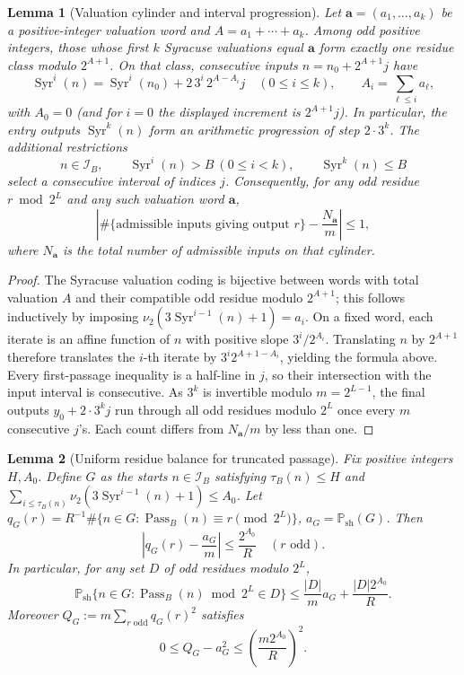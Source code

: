 \documentclass[11pt]{amsart}
\newtheorem{lemma}{Lemma}
\theoremstyle{remark}\newtheorem{remark}{Remark}
\newcommand{\Syr}{\operatorname{Syr}}
\newcommand{\Pass}{\operatorname{Pass}}
\newcommand{\Psh}{\mathbb P_{\mathrm{sh}}}
\begin{document}
\begin{lemma}[Valuation cylinder and interval progression]\label{lem:progression}
Let $\mathbf a=(a_1,\ldots,a_k)$ be a positive-integer valuation word and $A=a_1+\cdots+a_k$.  Among odd positive integers, those whose first $k$ Syracuse valuations equal $\mathbf a$ form exactly one residue class modulo $2^{A+1}$.  On that class, consecutive inputs $n=n_0+2^{A+1}j$ have
\[
 \Syr^i(n)=\Syr^i(n_0)+2\,3^i\,2^{A-A_i}j\quad(0\le i\le k),
 \qquad A_i=\sum_{\ell\le i}a_\ell,
\]
with $A_0=0$ (and for $i=0$ the displayed increment is $2^{A+1}j$).  In particular, the entry outputs $\Syr^k(n)$ form an arithmetic progression of step $2\cdot3^k$.  The additional restrictions
\[
 n\in\mathcal I_B,\qquad \Syr^i(n)>B\ (0\le i<k),\qquad
 \Syr^k(n)\le B
\]
select a \emph{consecutive interval} of indices $j$.  Consequently, for any odd residue $r\bmod2^L$ and any such valuation word $\mathbf a$,
\[
 \left|\#\{\text{admissible inputs giving output }r\}-\frac{N_{\mathbf a}}m\right|\le1,
\]
where $N_{\mathbf a}$ is the total number of admissible inputs on that cylinder.
\end{lemma}
\begin{proof}
The Syracuse valuation coding is bijective between words with total valuation $A$ and their compatible odd residue modulo $2^{A+1}$; this follows inductively by imposing $\nu_2(3\Syr^{i-1}(n)+1)=a_i$. On a fixed word, each iterate is an affine function of $n$ with positive slope $3^i/2^{A_i}$.  Translating $n$ by $2^{A+1}$ therefore translates the $i$-th iterate by $3^i2^{A+1-A_i}$, yielding the formula above.  Every first-passage inequality is a half-line in $j$, so their intersection with the input interval is consecutive.  As $3^k$ is invertible modulo $m=2^{L-1}$, the final outputs $y_0+2\cdot3^kj$ run through all odd residues modulo $2^L$ once every $m$ consecutive $j$'s.  Each count differs from $N_{\mathbf a}/m$ by less than one.
\end{proof}
\begin{lemma}[Uniform residue balance for truncated passage]\label{lem:balance}
Fix positive integers $H,A_0$.  Define $G$ as the starts $n\in\mathcal I_B$ satisfying $\tau_B(n)\le H$ and $\sum_{i\le\tau_B(n)}\nu_2(3\Syr^{i-1}(n)+1)\le A_0$.  Let $q_G(r)=R^{-1}\#\{n\in G:\Pass_B(n)\equiv r\pmod{2^L}\}$, $a_G=\Psh(G)$. Then
\begin{equation}\label{eq:residue}
 \boxed{\left|q_G(r)-\frac{a_G}{m}\right|\le \frac{2^{A_0}}R\quad (r\text{ odd}).}
\end{equation}
In particular, for any set $D$ of odd residues modulo $2^L$,
\begin{equation}\label{eq:dangerous}
 \Psh\{n\in G:\Pass_B(n)\bmod2^L\in D\}
 \le\frac{|D|}{m}a_G+\frac{|D|2^{A_0}}R.
\end{equation}
Moreover $Q_G:=m\sum_{r\text{ odd}}q_G(r)^2$ satisfies
\begin{equation}\label{eq:goodQ}
 0\le Q_G-a_G^2\le\left(\frac{m2^{A_0}}R\right)^2.
\end{equation}
\end{lemma}
\end{document}
